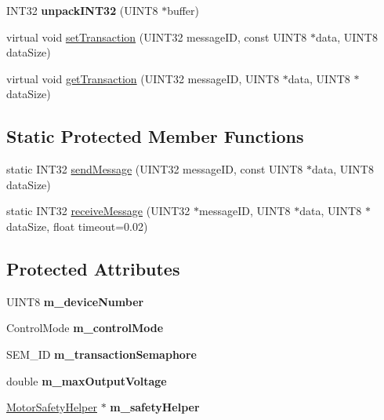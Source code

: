 \begin{DoxyCompactItemize}
\item 
\hypertarget{classCANJaguar_a14598f98ca14a4914f54d5d896dc0f8b}{
INT32 {\bfseries unpackINT32} (UINT8 $\ast$buffer)}
\label{classCANJaguar_a14598f98ca14a4914f54d5d896dc0f8b}

\item 
virtual void \hyperlink{classCANJaguar_adbe1668f13ba9cc7275c694c5aae01e0}{setTransaction} (UINT32 messageID, const UINT8 $\ast$data, UINT8 dataSize)
\item 
virtual void \hyperlink{classCANJaguar_a43eb6ab169c31a833dc38fd95eeca06e}{getTransaction} (UINT32 messageID, UINT8 $\ast$data, UINT8 $\ast$dataSize)
\end{DoxyCompactItemize}
\subsection*{Static Protected Member Functions}
\begin{DoxyCompactItemize}
\item 
static INT32 \hyperlink{classCANJaguar_a987e2191d5fc2500c8716aae68b0c567}{sendMessage} (UINT32 messageID, const UINT8 $\ast$data, UINT8 dataSize)
\item 
static INT32 \hyperlink{classCANJaguar_a1e0c5c0239cf68e173cf7f544e8b410f}{receiveMessage} (UINT32 $\ast$messageID, UINT8 $\ast$data, UINT8 $\ast$dataSize, float timeout=0.02)
\end{DoxyCompactItemize}
\subsection*{Protected Attributes}
\begin{DoxyCompactItemize}
\item 
\hypertarget{classCANJaguar_a1ec39f805b70e0b890b2d8477dac3513}{
UINT8 {\bfseries m\_\-deviceNumber}}
\label{classCANJaguar_a1ec39f805b70e0b890b2d8477dac3513}

\item 
\hypertarget{classCANJaguar_a255c79e2d98242b82719bd0b8c8e564e}{
ControlMode {\bfseries m\_\-controlMode}}
\label{classCANJaguar_a255c79e2d98242b82719bd0b8c8e564e}

\item 
\hypertarget{classCANJaguar_a0bf021133f8fa50fa5ca7542a42c7675}{
SEM\_\-ID {\bfseries m\_\-transactionSemaphore}}
\label{classCANJaguar_a0bf021133f8fa50fa5ca7542a42c7675}

\item 
\hypertarget{classCANJaguar_a2acc3a3074f73dedcd7f7d9032902adf}{
double {\bfseries m\_\-maxOutputVoltage}}
\label{classCANJaguar_a2acc3a3074f73dedcd7f7d9032902adf}

\item 
\hypertarget{classCANJaguar_ad84f27b89d83908933491f70397f971e}{
\hyperlink{classMotorSafetyHelper}{MotorSafetyHelper} $\ast$ {\bfseries m\_\-safetyHelper}}
\label{classCANJaguar_ad84f27b89d83908933491f70397f971e}

\end{DoxyCompactItemize}


